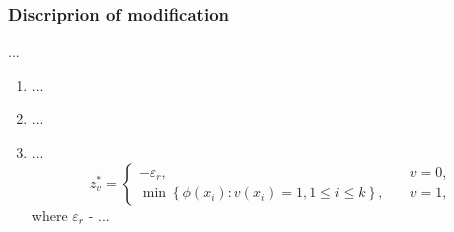 \documentclass[runningheads]{llncs}
\begin{document}
\subsubsection{Discriprion of modification} ...
\begin{enumerate} 
  \item ...
  \item ...
  \item ...
\begin{equation}
z_v^*=
  \begin{cases}
    -\varepsilon _r, & {\quad v=0 ,}\\
    \min \left\{ \phi (x_i): v(x_i)=1, 1 \leq i \leq k \right\}, & {\quad v=1 ,}
  \end{cases}
\end{equation}
where $\varepsilon _r$ - ...


\end{enumerate}
\end{document}
